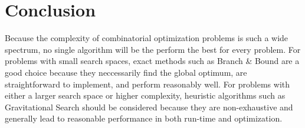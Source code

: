 \documentclass{article}
\begin{document}
    \section*{Conclusion}

        Because the complexity of combinatorial optimization problems is such a wide spectrum, no single algorithm will be the perform the best for every problem.  For problems with small search spaces, exact methods such as Branch \& Bound are a good choice because they neccessarily find the global optimum, are straightforward to implement, and perform reasonably well.  For problems with either a larger search space or higher complexity, heuristic algorithms such as Gravitational Search should be considered because they are non-exhaustive and generally lead to reasonable performance in both run-time and optimization.  

    \printbibliography
\end{document}
